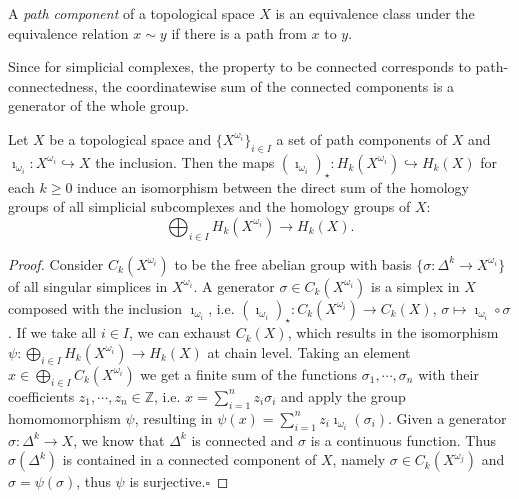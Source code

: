 \documentclass[envcountsect,runningheads]{llncs}
\renewcommand{\qed}{\hfill$\square$}
\begin{document}
\begin{definition}
A \emph{path component} of a topological space $X$ is an equivalence class under the equivalence relation $x \sim y$ if there is a path from $x$ to $y$.
\end{definition}

\begin{remarkdef}
Since for simplicial complexes, the property to be connected corresponds to path-connectedness, the coordinatewise sum of the connected components is a generator of the whole group.
\end{remarkdef}

\begin{theorem}{\cite[p.~129]{hatcher2002algebraic}}
Let $X$ be a topological space and $\{X^{\omega_{i}}\}_{i \in I}$ a set of path components of $X$ and $\imath_{\omega_{i}}: X^{\omega_{i}} \hookrightarrow X$ the inclusion. Then the maps $(\imath_{\omega_{i}})_\star: H_k(X^{\omega_{i}}) \hookrightarrow H_k(X)$ for each $k \geq 0$ induce an isomorphism between the direct sum of the homology groups of all simplicial subcomplexes and the homology groups of $X$:
\begin{equation}
	\bigoplus_{i \in I} H_k(X^{\omega_{i}}) \rightarrow H_k(X).
\end{equation}
\end{theorem}

\begin{proof}Consider $C_k(X^{\omega_{i}})$ to be the free abelian group with basis $\{\sigma: \Delta^k \rightarrow X^{\omega_{i}}\}$ of all singular simplices in $X^{\omega_{i}}$. A generator $\sigma \in C_{k}(X^{\omega_{i}})$ is a simplex in $X$ composed with the inclusion $\imath_{\omega_{i}}$, i.e. $(\imath_{\omega_{i}})_\star: C_k(X^{\omega_{i}}) \rightarrow C_k(X)$, $\sigma \mapsto \imath_{\omega_{i}} \circ \sigma$. If we take all $i \in I$, we can exhaust $C_k(X)$, which results in the isomorphism $\psi: \bigoplus_{i \in I} H_k(X^{\omega_{i}}) \rightarrow H_k(X)$ at chain level. Taking an element $x \in \bigoplus_{i \in I} C_k(X^{\omega_{i}})$ we get a finite sum of the functions $\sigma_1, \cdots, \sigma_n$ with their coefficients $z_1, \cdots, z_n \in \mathbb{Z}$, i.e. $x = \sum_{i=1}^{n} z_i\sigma_i$ and apply the group homomomorphism $\psi$, resulting in $\psi(x) = \sum_{i=1}^{n} z_i \imath_{\omega_i}(\sigma_i)$. Given a generator $\sigma: \Delta^k \rightarrow X$, we know that $\Delta^k$ is connected and $\sigma$ is a continuous function. Thus $\sigma(\Delta^k)$ is contained in a connected component of $X$, namely $\sigma \in C_k(X^{\omega_{j}})$ and $\sigma = \psi(\sigma)$, thus $\psi$ is surjective.\qed
\end{proof}
\end{document}
